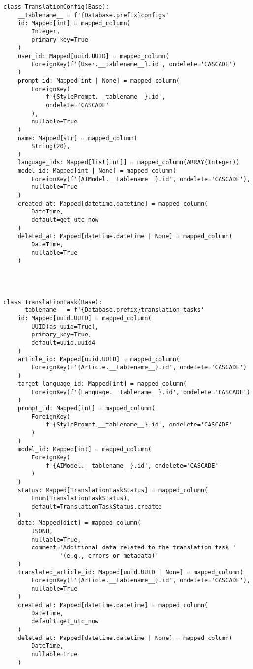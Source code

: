 \begin{lstlisting}
class TranslationConfig(Base):
    __tablename__ = f'{Database.prefix}configs'
    id: Mapped[int] = mapped_column(
        Integer,
        primary_key=True
    )
    user_id: Mapped[uuid.UUID] = mapped_column(
        ForeignKey(f'{User.__tablename__}.id', ondelete='CASCADE')
    )
    prompt_id: Mapped[int | None] = mapped_column(
        ForeignKey(
            f'{StylePrompt.__tablename__}.id',
            ondelete='CASCADE'
        ),
        nullable=True
    )
    name: Mapped[str] = mapped_column(
        String(20),
    )
    language_ids: Mapped[list[int]] = mapped_column(ARRAY(Integer))
    model_id: Mapped[int | None] = mapped_column(
        ForeignKey(f'{AIModel.__tablename__}.id', ondelete='CASCADE'),
        nullable=True
    )
    created_at: Mapped[datetime.datetime] = mapped_column(
        DateTime,
        default=get_utc_now
    )
    deleted_at: Mapped[datetime.datetime | None] = mapped_column(
        DateTime,
        nullable=True
    )




class TranslationTask(Base):
    __tablename__ = f'{Database.prefix}translation_tasks'
    id: Mapped[uuid.UUID] = mapped_column(
        UUID(as_uuid=True),
        primary_key=True,
        default=uuid.uuid4
    )
    article_id: Mapped[uuid.UUID] = mapped_column(
        ForeignKey(f'{Article.__tablename__}.id', ondelete='CASCADE')
    )
    target_language_id: Mapped[int] = mapped_column(
        ForeignKey(f'{Language.__tablename__}.id', ondelete='CASCADE')
    )
    prompt_id: Mapped[int] = mapped_column(
        ForeignKey(
            f'{StylePrompt.__tablename__}.id', ondelete='CASCADE'
        )
    )
    model_id: Mapped[int] = mapped_column(
        ForeignKey(
            f'{AIModel.__tablename__}.id', ondelete='CASCADE'
        )
    )
    status: Mapped[TranslationTaskStatus] = mapped_column(
        Enum(TranslationTaskStatus),
        default=TranslationTaskStatus.created
    )
    data: Mapped[dict] = mapped_column(
        JSONB,
        nullable=True,
        comment='Additional data related to the translation task '
                '(e.g., errors or metadata)'
    )
    translated_article_id: Mapped[uuid.UUID | None] = mapped_column(
        ForeignKey(f'{Article.__tablename__}.id', ondelete='CASCADE'),
        nullable=True
    )
    created_at: Mapped[datetime.datetime] = mapped_column(
        DateTime,
        default=get_utc_now
    )
    deleted_at: Mapped[datetime.datetime | None] = mapped_column(
        DateTime,
        nullable=True
    )





\end{lstlisting}
